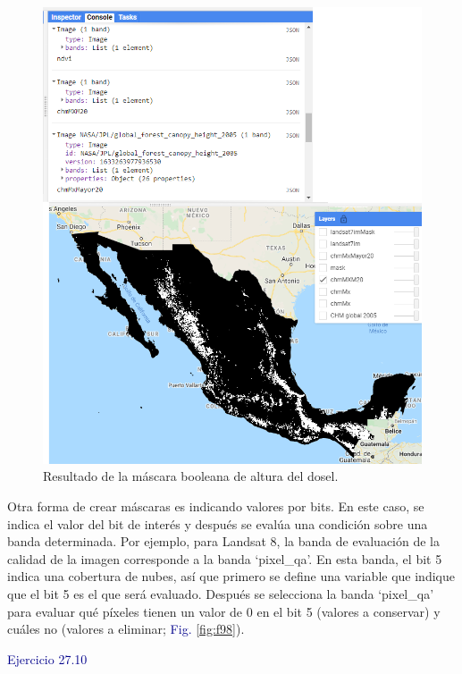 \documentclass[
  12pt,
  letterpaper,
  twoside]{book}
\begin{document}
\begin{figure}[H]

{\centering \includegraphics[width=0.95\linewidth]{Img/ej277} 

}

\caption{Resultado de la máscara booleana de altura del dosel.}\label{fig:f97}
\end{figure}

Otra forma de crear máscaras es indicando valores por bits. En este caso, se indica el valor del bit de interés y después se evalúa una condición sobre una banda determinada. Por ejemplo, para Landsat 8, la banda de evaluación de la calidad de la imagen corresponde a la banda `pixel\_qa'. En esta banda, el bit 5 indica una cobertura de nubes, así que primero se define una variable que indique que el bit 5 es el que será evaluado. Después se selecciona la banda `pixel\_qa' para evaluar qué píxeles tienen un valor de 0 en el bit 5 (valores a conservar) y cuáles no (valores a eliminar; \textcolor{darkblue}{Fig.} \ref{fig:f98}).

\textcolor{darkblue}{Ejercicio 27.10}
\end{document}

